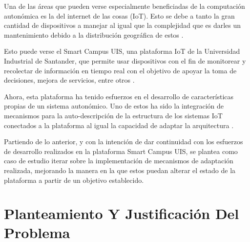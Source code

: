 \documentclass[12pt]{article}
\begin{document}


    Una de las áreas que pueden verse especialmente beneficiadas de la computación autonómica es la del internet de las cosas (IoT). Esto se debe a tanto la gran cantidad de dispositivos a manejar al igual que la complejidad que es darles un mantenimiento debido a la distribución geográfica de estos \cite{Tahir_2019}. 
    
    Esto puede verse el Smart Campus UIS, una plataforma IoT de la Universidad Industrial de Santander, que permite usar dispositivos con el fin de monitorear y recolectar de información en tiempo real con el objetivo de apoyar la toma de decisiones, mejora de servicios, entre otros \cite{henry_2020}.

    Ahora, esta plataforma ha tenido esfuerzos en el desarrollo de características propias de un sistema autonómico. Uno de estos ha sido la integración de mecanismos para la auto-descripción de la estructura de los sistemas IoT conectados a la plataforma al igual la capacidad de adaptar la arquitectura \cite{henry_2020}. %
    

    Partiendo de lo anterior, y con la intención de dar continuidad con los esfuerzos de desarrollo realizados en la plataforma Smart Campus UIS, se plantea como caso de estudio iterar sobre la implementación de mecanismos de adaptación realizada, mejorando la manera en la que estos puedan alterar el estado de la plataforma a partir de un objetivo establecido.  


    \section{Planteamiento Y Justificación Del Problema}
    
\end{document}
